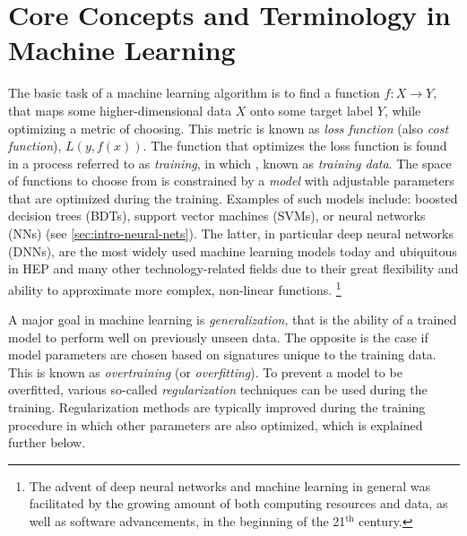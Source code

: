 \section{Core Concepts and Terminology in Machine Learning}
The basic task of a machine learning algorithm is to find a function $f: X \rightarrow Y$, that maps some higher-dimensional data $X$ onto some target label $Y$, while optimizing a metric of choosing.
This metric is known as \emph{loss function} (also \emph{cost function}), $L(y, f(x))$.
The function that optimizes the loss function is found in a process referred to as \emph{training}, in which , known as \emph{training data}.
The space of functions to choose from is constrained by a \emph{model} with adjustable parameters that are optimized during the training. Examples of such models include: boosted decision trees (BDTs), support vector machines (SVMs), or neural networks (NNs) (see \cref{sec:intro-neural-nets}). The latter, in particular deep neural networks (DNNs), are the most widely used machine learning models today and ubiquitous in HEP and many other technology-related fields due to their great flexibility and ability to approximate more complex, non-linear functions.  \footnote{The advent of deep neural networks and machine learning in general was facilitated by the growing amount of both computing resources and data, as well as software advancements, in the beginning of the 21$^{\text{th}}$ century.}



A major goal in machine learning is \emph{generalization}, that is the ability of a trained model to perform well on previously unseen data.
The opposite is the case if model parameters are chosen based on signatures unique to the training data. This is known as \emph{overtraining} (or \emph{overfitting}). To prevent a model to be overfitted, various so-called \emph{regularization} techniques can be used during the training.
Regularization methods are typically improved during the training procedure in which other parameters are also optimized, which is explained further below.


